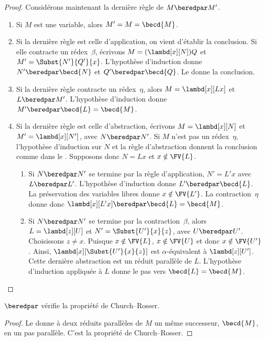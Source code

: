 \documentclass[../../../include/open-logic-section]{subfiles}
\begin{document}
\begin{proof}
Considérons maintenant la dernière règle de
$M\beredpar M'$.
\begin{enumerate}
\item Si $M$ est une variable, alors $M'=M=\becd{M}$.
\item Si la dernière règle est celle d'application, on vient
  d'établir la conclusion. Si elle contracte un rédex~$\beta$,
  écrivons $M=(\lambd[x][N])Q$ et
  $M'=\Subst{N'}{Q'}{x}$. L'hypothèse d'induction donne
  $N'\beredpar\becd{N}$ et $Q'\beredpar\becd{Q}$.
  Le  donne la conclusion.
\item Si la dernière règle contracte un rédex~$\eta$,
  alors $M=\lambd[x][Lx]$ et $L\beredpar M'$.
  L'hypothèse d'induction donne
  $M'\beredpar\becd{L}=\becd{M}$.
\item Si la dernière règle est celle d'abstraction, écrivons
  $M=\lambd[x][N]$ et $M'=\lambd[x][N']$, avec
  $N\beredpar N'$. Si $M$ n'est pas un rédex~$\eta$,
  l'hypothèse d'induction sur $N$ et la règle d'abstraction
  donnent la conclusion comme dans le .
  Supposons donc $N=Lx$ et $x\notin\FV{L}$.
  \begin{enumerate}
  \item Si $N\beredpar N'$ se termine par la règle
    d'application, $N'=L'x$ avec $L\beredpar L'$.
    L'hypothèse d'induction donne $L'\beredpar\becd{L}$.
    La préservation des variables libres donne
    $x\notin\FV{L'}$. La contraction~$\eta$ donne donc
    $\lambd[x][L'x]\beredpar\becd{L}=\becd{M}$.
  \item Si $N\beredpar N'$ se termine par la
    contraction~$\beta$, alors $L=\lambd[z][U]$ et
    $N'=\Subst{U'}{x}{z}$, avec $U\beredpar U'$.
    Choisissons $z\neq x$. Puisque $x\notin\FV{L}$,
    $x\notin\FV{U}$ et donc $x\notin\FV{U'}$.
    Ainsi, $\lambd[x][\Subst{U'}{x}{z}]$ est
    $\alpha$-équivalent à $\lambd[z][U']$.
    Cette dernière abstraction est un réduit parallèle
    de $L$. L'hypothèse d'induction appliquée à $L$
    donne le pas vers $\becd{L}=\becd{M}$.
  \end{enumerate}
\end{enumerate}
\end{proof}

\begin{thm}
$\beredpar$ vérifie la propriété de
Church--Rosser.
\end{thm}

\begin{proof}
Le  donne à deux réduits parallèles de $M$
un même successeur, $\becd{M}$, en un pas parallèle.
C'est la propriété de Church--Rosser.
\end{proof}
\end{document}
